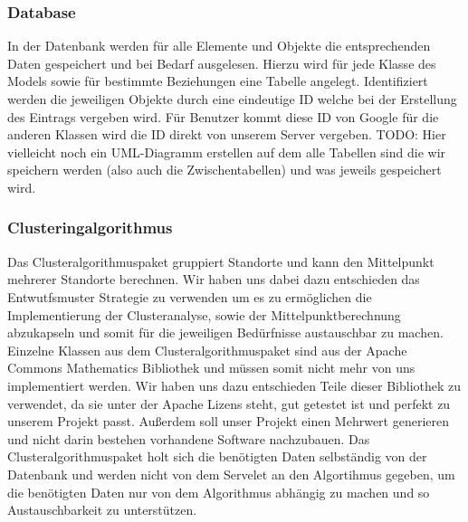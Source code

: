 	\subsubsection{Database}
	In der Datenbank werden für alle Elemente und Objekte die entsprechenden Daten gespeichert und bei Bedarf ausgelesen. Hierzu wird für jede Klasse des Models sowie für bestimmte Beziehungen eine Tabelle angelegt.
Identifiziert werden die jeweiligen Objekte durch eine eindeutige ID welche bei der Erstellung des Eintrags vergeben wird.
Für Benutzer kommt diese ID von Google für die anderen Klassen wird die ID direkt von unserem Server vergeben.
TODO: Hier vielleicht noch ein UML-Diagramm erstellen auf dem alle Tabellen sind die wir speichern werden (also auch die Zwischentabellen) und was jeweils gespeichert wird.

	\subsubsection{Clusteringalgorithmus}
	Das Clusteralgorithmuspaket gruppiert Standorte und kann den Mittelpunkt mehrerer Standorte berechnen. Wir haben uns dabei dazu entschieden das Entwutfsmuster Strategie zu verwenden um es zu ermöglichen die Implementierung der Clusteranalyse, sowie der Mittelpunktberechnung abzukapseln und somit für die jeweiligen Bedürfnisse austauschbar zu machen. Einzelne Klassen aus dem Clusteralgorithmuspaket sind aus der Apache Commons Mathematics Bibliothek und müssen somit nicht mehr von uns implementiert werden. Wir haben uns dazu entschieden Teile dieser Bibliothek zu verwendet, da sie unter der Apache Lizens steht, gut getestet ist und perfekt zu unserem Projekt passt. Außerdem soll unser Projekt einen Mehrwert generieren und nicht darin bestehen vorhandene Software nachzubauen. Das Clusteralgorithmuspaket holt sich die benötigten Daten selbständig von der Datenbank und werden nicht von dem Servelet an den Algortihmus gegeben, um die benötigten Daten nur von dem Algorithmus abhängig zu machen und so Austauschbarkeit zu unterstützen.

